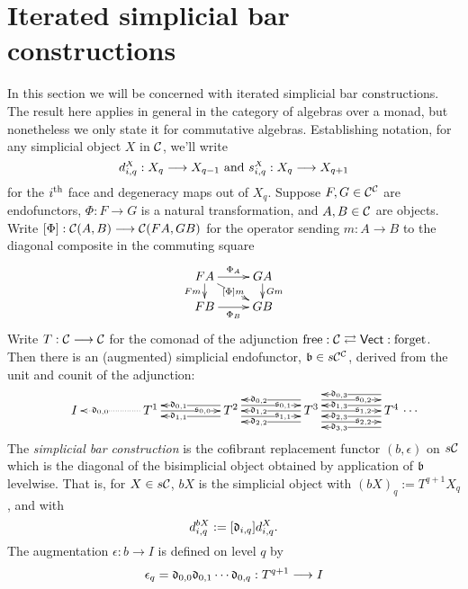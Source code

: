 \documentclass[11pt]{amsart}
\theoremstyle{plain}
\begin{document}
\section{Iterated simplicial bar constructions}\label{sec:ItSimpBar}
\newcommand{\algCat}{\calC}
\newcommand{\trip}[3]{{#1}_{\smash{#2}}^{\smash{#3}}}
In this section we will be concerned with iterated simplicial bar constructions. The result here applies in general in the category of algebras over a monad, but nonetheless we only state it for commutative algebras. Establishing notation, for any simplicial object $X$ in $\algCat$, we'll write 
\[\trip{d}{i,q}{X}:X_q\to X_{q-1}\textup{\ and\ }\trip{s}{i,q}{X}:X_q\to X_{q+1}\]
for the $i^\textup{th}$ face and degeneracy maps out of $X_q$. Suppose $F,G\in\algCat^\algCat$ are endofunctors, $\Phi:F\to G$ is a natural transformation, and $A,B\in\algCat$ are objects. Write $[\Phi]:\algCat(A,B)\to\algCat(FA,GB)$ for the operator sending $m:A\to B$ to the diagonal composite in the commuting square
\[\xymatrix@R=4mm{
FA
\ar[r]^-{\Phi_A}
\ar[d]_-{Fm}
\ar[dr]|-{[\Phi]m}
&%
GA
\ar[d]^-{Gm}
\\%
FB
\ar[r]_-{\Phi_B}
&%
GB
}\]
Write $T:\algCat\to \algCat$ for the comonad of the adjunction $\textup{free}:\algCat\rightleftarrows\mathsf{Vect}:\textup{forget}$. Then there is an (augmented) simplicial endofunctor, $\frakb\in s\algCat^\algCat$, derived from the unit and counit of the adjunction:
\[\vcenter{
\def\labelstyle{\scriptstyle}
\xymatrix@C=1.65cm@1{
{\ I\,}
&
\,T^1\,
\ar@{..>}[l]|(.65){\frakd_{0,0}}
\ar[r]|(.65){\fraks_{0,0}}
&
\,T^2\,
\ar@<-1ex>[l]|(.65){\frakd_{0,1}}
\ar@<+1ex>[l]|(.65){\frakd_{1,1}}
\ar@<+1ex>[r]|(.65){\fraks_{0,1}}
\ar@<-1ex>[r]|(.65){\fraks_{1,1}}
&
\,T^3\,
\ar[l]|(.65){\frakd_{1,2}}
\ar@<-2ex>[l]|(.65){\frakd_{0,2}}
\ar@<+2ex>[l]|(.65){\frakd_{2,2}}
\ar[r]|(.65){\fraks_{1,2}}
\ar@<+2ex>[r]|(.65){\fraks_{0,2}}
\ar@<-2ex>[r]|(.65){\fraks_{2,2}}
&
\,T^4\,\makebox[0cm][l]{\,$\cdots $}
\ar@<-3ex>[l]|(.65){\frakd_{0,3}}
\ar@<-1ex>[l]|(.65){\frakd_{1,3}}
\ar@<+1ex>[l]|(.65){\frakd_{2,3}}
\ar@<+3ex>[l]|(.65){\frakd_{3,3}}
}}\]
The \emph{simplicial bar construction} is the cofibrant replacement functor $(b,\epsilon)$ on $s\algCat$ which is the diagonal of the bisimplicial object obtained by application of $\mathfrak{b}$ levelwise. That is, for $X\in s\algCat$, $bX$ is the simplicial object with $(bX)_q:=T^{q+1}X_q$, and with
\[\trip{d}{i,q}{bX}:=[\frakd_{i,q}]\trip{d}{i,q}{X}.\]
The augmentation $\epsilon:b\to I$ is defined on level $q$ by 
\[\epsilon_q=\mathfrak{d}_{0,0}\mathfrak{d}_{0,1}\cdots \mathfrak{d}_{0,q}:T^{q+1}\longrightarrow I\]
\end{document}
